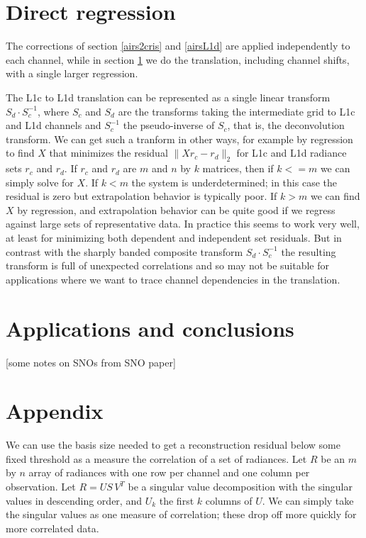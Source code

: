 \documentclass[11pt]{article}
\begin{document}
\FloatBarrier
\section{Direct regression}
\label{dregr}

The corrections of section \ref{airs2cris} and \ref{airsL1d} are
applied independently to each channel, while in section \ref{dregr}
we do the translation, including channel shifts, with a single
larger regression.

The L1c to L1d translation can be represented as a single linear
transform $S_d\cdot S_c^{-1}$, where $S_c$ and $S_d$ are the
transforms taking the intermediate grid to L1c and L1d channels and
$S_c^{-1}$ the pseudo-inverse of $S_c$, that is, the deconvolution
transform.  We can get such a tranform in other ways, for example by
regression to find $X$ that minimizes the residual $\|X r_c -
r_d\|_2$ for L1c and L1d radiance sets $r_c$ and $r_d$.  If $r_c$ and
$r_d$ are $m$ and $n$ by $k$ matrices, then if $k <= m$ we can simply
solve for $X$.  If $k < m$ the system is underdetermined; in this
case the residual is zero but extrapolation behavior is typically
poor.  If $k > m$ we can find $X$ by regression, and extrapolation
behavior can be quite good if we regress against large sets of
representative data.  In practice this seems to work very well, at
least for minimizing both dependent and independent set residuals.
But in contrast with the sharply banded composite transform $S_d\cdot
S_c^{-1}$ the resulting transform is full of unexpected correlations
and so may not be suitable for applications where we want to trace
channel dependencies in the translation.

\FloatBarrier
\section{Applications and conclusions}
\label{appcon}

[some notes on SNOs from SNO paper]

\FloatBarrier
\section{Appendix}
\label{append}

We can use the basis size needed to get a reconstruction residual
below some fixed threshold as a measure the correlation of a set of
radiances.  Let $R$ be an $m$ by $n$ array of radiances with one row
per channel and one column per observation.  Let $R=U S\,V^T$ be a
singular value decomposition with the singular values in descending
order, and $U_k$ the first $k$ columns of $U$.  We can simply take
the singular values as one measure of correlation; these drop off
more quickly for more correlated data.
\end{document}
